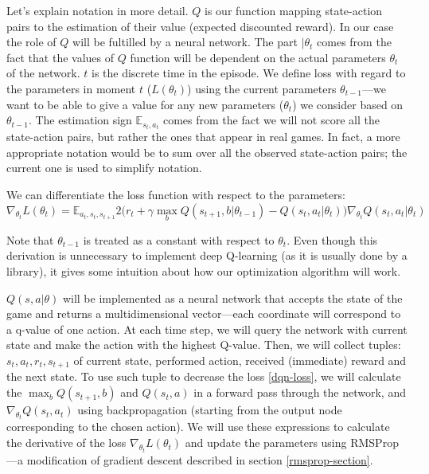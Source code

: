 Let's explain notation in more detail. $Q$ is our function mapping state-action pairs to the estimation of their value (expected discounted reward). In our case the role of $Q$ will be fultilled by a neural network. The part $|\theta_t$ comes from the fact that the values of $Q$ function will be dependent on the actual parameters $\theta_t$ of the network. $t$ is the discrete time in the episode. We define loss with regard to the parameters in moment $t$ ($L(\theta_t)$) using the current parameters $\theta_{t-1}$---we want to be able to give a value for any new parameters ($\theta_t$) we consider based on $\theta_{t-1}$. The estimation sign $\mathbb{E}_{s_t, a_t}$ comes from the fact we will not score all the state-action pairs, but rather the ones that appear in real games. In fact, a more appropriate notation would be to sum over all the observed state-action pairs; the current one is used to simplify notation.

We can differentiate the loss function with respect to the parameters:
\begin{equation}
  \nabla_{\theta_t} L(\theta_t) = \mathbb{E}_{a_t,s_t, s_{t+1}} 2\Big(
  r_t + \gamma \max_b Q(s_{t+1}, b|\theta_{t-1}) - Q(s_t, a_t|\theta_t)\Big)
  \nabla_{\theta_t} Q(s_t, a_t|\theta_t)
\end{equation}

Note that $\theta_{t-1}$ is treated as a constant with respect to $\theta_t$. Even though this derivation is unnecessary to implement deep Q-learning (as it is usually done by a library), it gives some intuition about how our optimization algorithm will work.

$Q(s, a|\theta)$ will be implemented as a neural network that accepts the state of the game and returns a multidimensional vector---each coordinate will correspond to a q-value of one action. At each time step, we will query the network with current state and make the action with the highest Q-value.
Then, we will collect tuples: $s_t, a_t, r_t, s_{t+1}$ of current state, performed action, received (immediate) reward and the next state. To use such tuple to decrease the loss \eqref{dqn-loss}, we will calculate the $\max_b Q(s_{t+1}, b)$ and $Q(s_t, a)$ in a forward pass through the network, and $\nabla_{\theta_t} Q(s_t, a_t)$ using backpropagation (starting from the output node corresponding to the chosen action). We will use these expressions to calculate the derivative of the loss $\nabla_{\theta_t} L(\theta_t)$ and update the parameters using RMSProp---a modification of gradient descent described in section \ref{rmsprop-section}.

